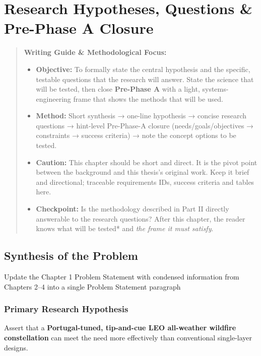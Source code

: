 \chapter{Research Hypotheses, Questions \& Pre-Phase A
Closure}\label{chapter-5-research-hypotheses-questions--pre-phase-a-closure}

\begin{quote}
\textbf{Writing Guide \& Methodological Focus:}

\begin{itemize}
\item
  \textbf{Objective:} To formally state the central hypothesis and the
  specific, testable questions that the research will answer. State the
  science that will be tested, then close \textbf{Pre-Phase A} with a
  light, systems-engineering frame that shows the methods that will be
  used.
\item
  \textbf{Method:} Short synthesis → one-line hypothesis → concise
  research questions → hint-level Pre-Phase-A closure
  (needs/goals/objectives → constraints → success criteria) → note the
  concept options to be tested.
\item
  \textbf{Caution:} This chapter should be short and direct. It is the
  pivot point between the background and this thesis's original work.
  Keep it brief and directional; traceable requirements IDs, success
  criteria and tables here.
\item
  \textbf{Checkpoint:} Is the methodology described in Part II directly
  answerable to the research questions? After this chapter, the reader
  knows what will be tested* and \emph{the frame it must satisfy}.
\end{itemize}
\end{quote}

\section{Synthesis of the
Problem}\label{51-synthesis-of-the-problem}

Update the Chapter 1 Problem Statement with condensed information from
Chapters 2--4 into a single Problem Statement paragraph

\subsection{Primary Research
Hypothesis}\label{52-primary-research-hypothesis}

Assert that a \textbf{Portugal-tuned, tip-and-cue LEO all-weather
wildfire constellation} can meet the need more effectively than
conventional single-layer designs.

